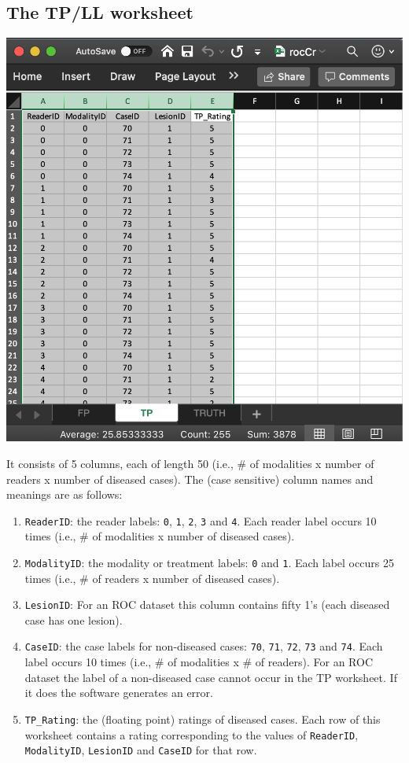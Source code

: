 \documentclass[
]{book}
\begin{document}
\hypertarget{quick-start-roc-tp}{%
\subsection{The TP/LL worksheet}\label{quick-start-roc-tp}}

\includegraphics[width=1\textwidth,height=\textheight]{images/quick-start/rocCrTp.png}

It consists of 5 columns, each of length 50 (i.e., \# of modalities x number of readers x number of diseased cases). The (case sensitive) column names and meanings are as follows:

\begin{enumerate}
\def\labelenumi{\arabic{enumi}.}
\item
  \texttt{ReaderID}: the reader labels: \texttt{0}, \texttt{1}, \texttt{2}, \texttt{3} and \texttt{4}. Each reader label occurs 10 times (i.e., \# of modalities x number of diseased cases).
\item
  \texttt{ModalityID}: the modality or treatment labels: \texttt{0} and \texttt{1}. Each label occurs 25 times (i.e., \# of readers x number of diseased cases).
\item
  \texttt{LesionID}: For an ROC dataset this column contains fifty 1's (each diseased case has one lesion).
\item
  \texttt{CaseID}: the case labels for non-diseased cases: \texttt{70}, \texttt{71}, \texttt{72}, \texttt{73} and \texttt{74}. Each label occurs 10 times (i.e., \# of modalities x \# of readers). For an ROC dataset the label of a non-diseased case cannot occur in the TP worksheet. If it does the software generates an error.
\item
  \texttt{TP\_Rating}: the (floating point) ratings of diseased cases. Each row of this worksheet contains a rating corresponding to the values of \texttt{ReaderID}, \texttt{ModalityID}, \texttt{LesionID} and \texttt{CaseID} for that row.
\end{enumerate}
\end{document}
